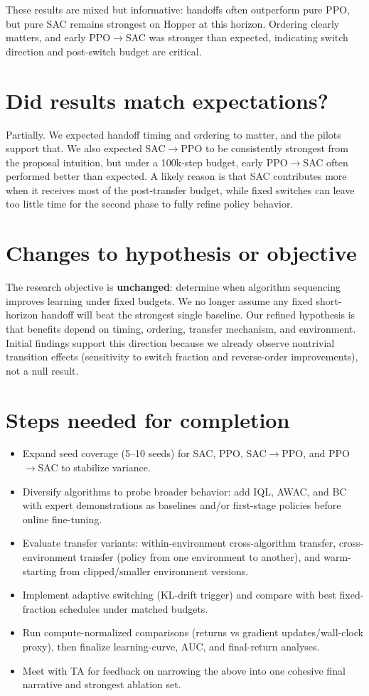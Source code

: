 \documentclass[10pt]{article}
\begin{document}
These results are mixed but informative: handoffs often outperform pure PPO, but pure SAC remains strongest on Hopper at this horizon. Ordering clearly matters, and early PPO$\rightarrow$SAC was stronger than expected, indicating switch direction and post-switch budget are critical.

\section*{Did results match expectations?}
Partially. We expected handoff timing and ordering to matter, and the pilots support that. We also expected SAC$\rightarrow$PPO to be consistently strongest from the proposal intuition, but under a 100k-step budget, early PPO$\rightarrow$SAC often performed better than expected. A likely reason is that SAC contributes more when it receives most of the post-transfer budget, while fixed switches can leave too little time for the second phase to fully refine policy behavior.

\section*{Changes to hypothesis or objective}
The research objective is \textbf{unchanged}: determine when algorithm sequencing improves learning under fixed budgets. We no longer assume any fixed short-horizon handoff will beat the strongest single baseline. Our refined hypothesis is that benefits depend on timing, ordering, transfer mechanism, and environment. Initial findings support this direction because we already observe nontrivial transition effects (sensitivity to switch fraction and reverse-order improvements), not a null result.

\section*{Steps needed for completion}
\begin{itemize}
    \item Expand seed coverage (5--10 seeds) for SAC, PPO, SAC$\rightarrow$PPO, and PPO$\rightarrow$SAC to stabilize variance.
    \item Diversify algorithms to probe broader behavior: add IQL, AWAC, and BC with expert demonstrations as baselines and/or first-stage policies before online fine-tuning.
    \item Evaluate transfer variants: within-environment cross-algorithm transfer, cross-environment transfer (policy from one environment to another), and warm-starting from clipped/smaller environment versions.
    \item Implement adaptive switching (KL-drift trigger) and compare with best fixed-fraction schedules under matched budgets.
    \item Run compute-normalized comparisons (returns vs gradient updates/wall-clock proxy), then finalize learning-curve, AUC, and final-return analyses.
    \item Meet with TA for feedback on narrowing the above into one cohesive final narrative and strongest ablation set.
\end{itemize}
\end{document}
